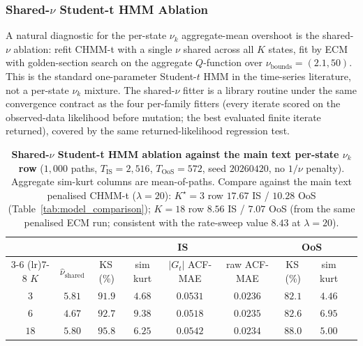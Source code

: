 \subsubsection{\texorpdfstring{Shared-$\nu$ Student-t HMM Ablation}{Shared-nu Student-t HMM Ablation}}
\label{sec:chmm_t_shared_nu}

A natural diagnostic for the per-state $\nu_k$ aggregate-mean overshoot is the shared-$\nu$ ablation: refit CHMM-t with a single $\nu$ shared across all $K$ states, fit by ECM with golden-section search on the aggregate $Q$-function over $\nu_{\text{bounds}} = (2.1, 50)$. This is the standard one-parameter Student-$t$ HMM in the time-series literature, not a per-state $\nu_k$ mixture. The shared-$\nu$ fitter is a library routine under the same convergence contract as the four per-family fitters (every iterate scored on the observed-data likelihood before mutation; the best evaluated finite iterate returned), covered by the same returned-likelihood regression test.

\begin{table}[!ht]
\centering
\small
\caption{\textbf{Shared-$\nu$ Student-t HMM ablation against the main text per-state $\nu_k$ row} ($1{,}000$ paths, $T_{\text{IS}} = 2{,}516$, $T_{\text{OoS}} = 572$, seed $20260420$, no $1/\nu$ penalty). Aggregate sim-kurt columns are mean-of-paths. Compare against the main text penalised CHMM-t ($\lambda = 20$): $K^\star = 3$ row $17.67$ IS / $10.28$ OoS (Table~\ref{tab:model_comparison}); $K = 18$ row $8.56$ IS / $7.07$ OoS (from the same penalised ECM run; consistent with the rate-sweep value $8.43$ at $\lambda=20$).}
\label{tab:chmm_t_shared_nu}
\begin{tabular}{c c c c c c c c c}
\toprule
& & \multicolumn{4}{c}{IS} & \multicolumn{2}{c}{OoS} & \\
\cmidrule(lr){3-6} \cmidrule(lr){7-8}
$K$ & $\hat\nu_{\text{shared}}$ & KS\,(\%) & sim kurt & $|G_t|$ ACF-MAE & raw ACF-MAE & KS\,(\%) & sim kurt & \\
\midrule
$3$  & $5.81$ & $91.9$ & $4.68$ & $0.0531$ & $0.0236$ & $82.1$ & $4.46$ & \\
$6$  & $4.67$ & $92.7$ & $9.38$ & $0.0518$ & $0.0235$ & $82.6$ & $6.95$ & \\
$18$ & $5.80$ & $\mathbf{95.8}$ & $\mathbf{6.25}$ & $0.0542$ & $0.0234$ & $\mathbf{88.0}$ & $\mathbf{5.00}$ & \\
\bottomrule
\end{tabular}
\end{table}

